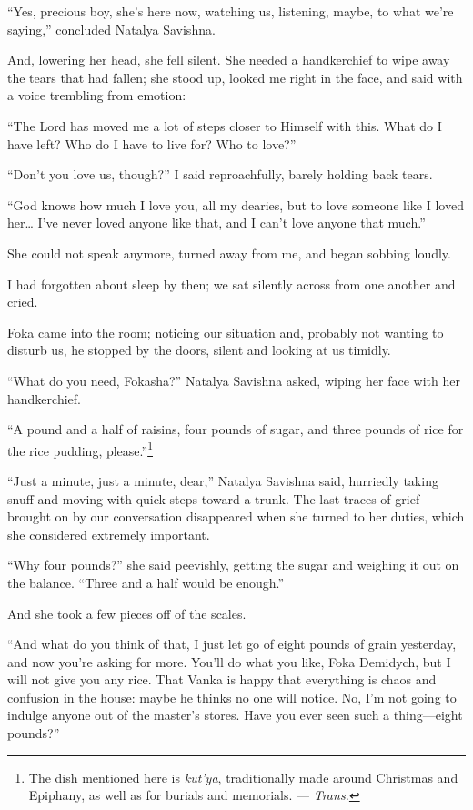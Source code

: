 ``Yes, precious boy, she's here now, watching us, listening, maybe, to what we're saying,'' concluded Natalya Savishna. %

And, lowering her head, she fell silent. She needed a handkerchief to wipe away the tears that had fallen; she stood up, looked me right in the face, and said with a voice trembling from emotion:

``The Lord has moved me a lot of steps closer to Himself with this. What do I have left? Who do I have to live for? Who to love?'' %

``Don't you love us, though?'' I said reproachfully, barely holding back tears. %

``God knows how much I love you, all my dearies, but to love someone like I loved her\ldots{} I've never loved anyone like that, and I can't love anyone that much.'' %

She could not speak anymore, turned away from me, and began sobbing loudly.

I had forgotten about sleep by then; we sat silently across from one another and cried.

Foka came into the room; noticing our situation and, probably not wanting to disturb us, he stopped by the doors, silent and looking at us timidly.

``What do you need, Fokasha?'' Natalya Savishna asked, wiping her face with her handkerchief. %

``A pound and a half of raisins, four pounds of sugar, and three pounds of rice for the rice pudding, please.''\footnote{The dish mentioned here is \textit{kut'ya}, traditionally made around Christmas and Epiphany, as well as for burials and memorials. --- \textit{Trans.}} %

``Just a minute, just a minute, dear,'' Natalya Savishna said, hurriedly taking snuff and moving with quick steps toward a trunk. The last traces of grief brought on by our conversation disappeared when she turned to her duties, which she considered extremely important.

``Why four pounds?'' she said peevishly, getting the sugar and weighing it out on the balance. ``Three and a half would be enough.'' %

And she took a few pieces off of the scales.

``And what do you think of that, I just let go of eight pounds of grain yesterday, and now you're asking for more. You'll do what you like, Foka Demidych, but I will not give you any rice. That Vanka is happy that everything is chaos and confusion in the house: maybe he thinks no one will notice. No, I'm not going to indulge anyone out of the master's stores. Have you ever seen such a thing---eight pounds?'' %

